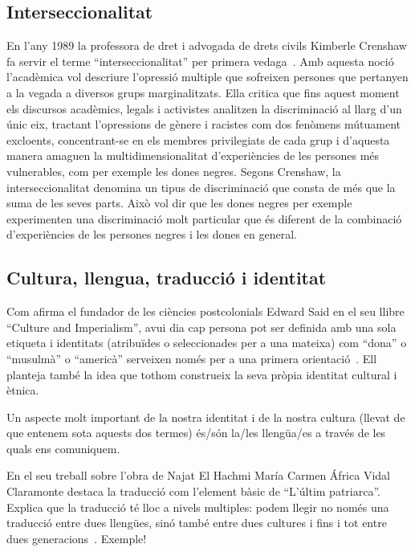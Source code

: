 \subsection{Interseccionalitat}
En l'any 1989 la professora de dret i advogada de drets civils Kimberle Crenshaw fa servir el terme ``interseccionalitat'' per primera vedaga~\autocite{Crenshaw1989}.
Amb aquesta noció l'acadèmica vol descriure l'opressió multiple que sofreixen persones que pertanyen a la vegada a diversos grups marginalitzats.
Ella critica que fins aquest moment els discursos acadèmics, legals i activistes analitzen la discriminació al llarg d'un únic eix,
tractant l'opressions de gènere i racistes com dos fenòmens mútuament excloents,
concentrant-se en els membres privilegiats de cada grup i d'aquesta manera amaguen la multidimensionalitat d'experiències de les persones més vulnerables, com per exemple les dones negres.
Segons Crenshaw, la interseccionalitat denomina un tipus de discriminació que consta de més que la suma de les seves parts.
Això vol dir que les dones negres per exemple experimenten una discriminació molt particular que és diferent de la combinació d'experiències de les persones negres i les dones en general.

\subsection{Cultura, llengua, traducció i identitat}
Com afirma el fundador de les ciències postcolonials Edward Said en el seu llibre ``Culture and Imperialism'', avui dia cap persona pot ser definida amb una sola etiqueta
i identitats (atribuïdes o seleccionades per a una mateixa) com ``dona'' o ``musulmà'' o ``americà'' serveixen només per a una primera orientació~\autocite{Vidal2012}.
Ell planteja també la idea que tothom construeix la seva pròpia identitat cultural i ètnica.



Un aspecte molt important de la nostra identitat i de la nostra cultura (llevat de que entenem sota aquests dos termes) és/són la/les llengüa/es a través de les quals ens comuniquem.


En el seu treball sobre l'obra de Najat El Hachmi María Carmen África Vidal Claramonte destaca la traducció com l'element bàsic de ``L'últim patriarca''.
Explica que la traducció té lloc a nivels multiples: podem llegir no només una traducció entre dues llengües, sinó també entre dues cultures i fins i tot entre dues generacions~\autocite{Vidal2012}.
Exemple!

